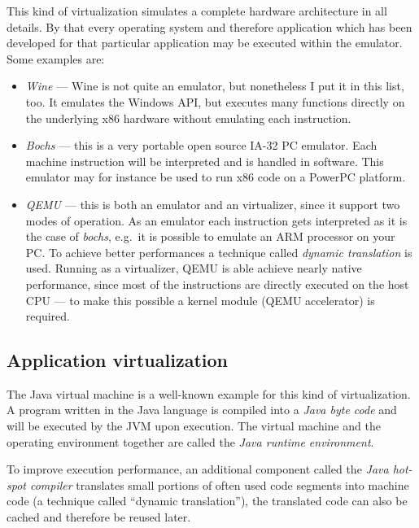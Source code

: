 This kind of virtualization  simulates a complete hardware architecture in
all  details. By  that every  operating system  and  therefore application
which has been  developed for that particular application  may be executed
within the emulator. Some examples are:
\begin{itemize}
\item  \emph{Wine \cite{wine}}  --- Wine  is  not quite  an emulator,  but
  nonetheless I put it in this list, too. It emulates the Windows API, but
  executes many functions directly  on the underlying x86 hardware without
  emulating each instruction.
\item \emph{Bochs  \cite{bochs}} --- this  is a very portable  open source
  IA-32 PC emulator.  Each machine  instruction will be interpreted and is
  handled in software.  This emulator may for instance be  used to run x86
  code on a PowerPC platform.
\item  \emph{QEMU  \cite{qemu}} ---  this  is  both  an emulator  and  an
  virtualizer, since  it support  two modes of  operation. As  an emulator
  each instruction  gets interpreted  as it is  the case  of \emph{bochs},
  e.g.~it is possible  to emulate an ARM processor on  your PC. To achieve
  better  performances a  technique called  \emph{dynamic  translation} is
  used.   Running as  a virtualizer,  QEMU is  able achieve  nearly native
  performance, since most of the instructions are directly executed on the
  host CPU --- to make this possible a kernel module (QEMU accelerator) is
  required.
\end{itemize}

\subsection{Application virtualization}
\label{sec:appl-level-virt}

The Java virtual machine \cite{java} is a well-known example for this kind
of virtualization. A program written in the Java language is compiled into
a  \emph{Java   byte  code}  and  will   be  executed  by   the  JVM  upon
execution. The virtual machine  and the operating environment together are
called the \emph{Java runtime environment}.

To  improve  execution performance,  an  additional  component called  the
\emph{Java hot-spot compiler} translates small portions of often used code
segments into  machine code (a technique  called ``dynamic translation''),
the translated code can also be cached and therefore be reused later.


